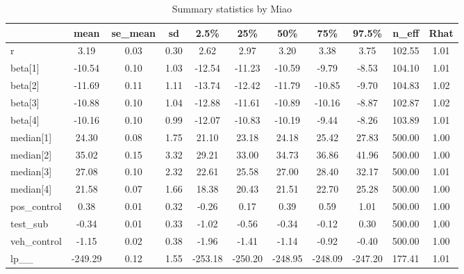 \documentclass[]{article}
\begin{document}
\begin{table}

\caption{\label{tab:result3}Summary statistics by Miao}
\centering
\begin{tabular}[t]{l|c|c|c|c|c|c|c|c|c|c}
\hline
  & mean & se\_mean & sd & 2.5\% & 25\% & 50\% & 75\% & 97.5\% & n\_eff & Rhat\\
\hline
r & 3.19 & 0.03 & 0.30 & 2.62 & 2.97 & 3.20 & 3.38 & 3.75 & 102.55 & 1.01\\
\hline
beta[1] & -10.54 & 0.10 & 1.03 & -12.54 & -11.23 & -10.59 & -9.79 & -8.53 & 104.10 & 1.01\\
\hline
beta[2] & -11.69 & 0.11 & 1.11 & -13.74 & -12.42 & -11.79 & -10.85 & -9.70 & 104.83 & 1.02\\
\hline
beta[3] & -10.88 & 0.10 & 1.04 & -12.88 & -11.61 & -10.89 & -10.16 & -8.87 & 102.87 & 1.02\\
\hline
beta[4] & -10.16 & 0.10 & 0.99 & -12.07 & -10.83 & -10.19 & -9.44 & -8.26 & 103.89 & 1.01\\
\hline
median[1] & 24.30 & 0.08 & 1.75 & 21.10 & 23.18 & 24.18 & 25.42 & 27.83 & 500.00 & 1.00\\
\hline
median[2] & 35.02 & 0.15 & 3.32 & 29.21 & 33.00 & 34.73 & 36.86 & 41.96 & 500.00 & 1.00\\
\hline
median[3] & 27.08 & 0.10 & 2.32 & 22.61 & 25.58 & 27.00 & 28.40 & 32.17 & 500.00 & 1.01\\
\hline
median[4] & 21.58 & 0.07 & 1.66 & 18.38 & 20.43 & 21.51 & 22.70 & 25.28 & 500.00 & 1.00\\
\hline
pos\_control & 0.38 & 0.01 & 0.32 & -0.26 & 0.17 & 0.39 & 0.59 & 1.01 & 500.00 & 1.00\\
\hline
test\_sub & -0.34 & 0.01 & 0.33 & -1.02 & -0.56 & -0.34 & -0.12 & 0.30 & 500.00 & 1.00\\
\hline
veh\_control & -1.15 & 0.02 & 0.38 & -1.96 & -1.41 & -1.14 & -0.92 & -0.40 & 500.00 & 1.00\\
\hline
lp\_\_ & -249.29 & 0.12 & 1.55 & -253.18 & -250.20 & -248.95 & -248.09 & -247.20 & 177.41 & 1.01\\
\hline
\end{tabular}
\end{table}
\end{document}
